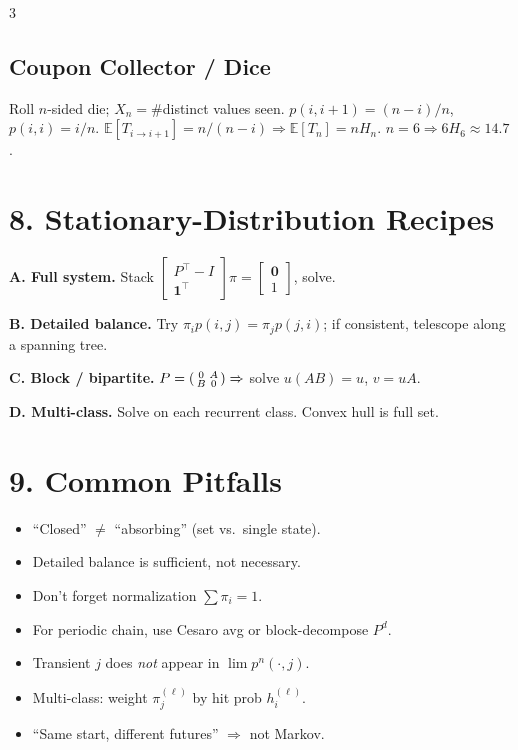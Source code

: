 \documentclass[8pt]{extarticle}
\newcommand{\E}{\mathbb{E}}
\renewcommand{\b}[1]{\mathbf{#1}}
\begin{document}
\begin{multicols*}{3}
		\subsection*{Coupon Collector / Dice}
		Roll $n$-sided die; $X_n=\#$distinct values seen. $p(i,i+1)=(n-i)/n$, $p(i,i)=i/n$. $\E[T_{i\to i+1}]=n/(n-i)\Rightarrow\E[T_n]=nH_n$. $n=6\Rightarrow 6H_6\approx 14.7$.
		
		\section*{8. Stationary-Distribution Recipes}
		
		\textbf{A. Full system.} Stack $\begin{bmatrix}P^\top-I\\ \b 1^\top\end{bmatrix}\!\pi=\begin{bmatrix}\b 0\\ 1\end{bmatrix}$, solve.
		
		\textbf{B. Detailed balance.} Try $\pi_i p(i,j)=\pi_j p(j,i)$; if consistent, telescope along a spanning tree.
		
		\textbf{C. Block / bipartite.} $P=\begin{psmallmatrix}0 & A\\ B & 0\end{psmallmatrix}\Rightarrow$ solve $u(AB)=u$, $v=uA$.
		
		\textbf{D. Multi-class.} Solve on each recurrent class. Convex hull is full set.
		
		\section*{9. Common Pitfalls}
		
		\begin{itemize}
			\item ``Closed'' $\ne$ ``absorbing'' (set vs.\ single state).
			\item Detailed balance is sufficient, not necessary.
			\item Don't forget normalization $\sum\pi_i=1$.
			\item For periodic chain, use Cesaro avg or block-decompose $P^d$.
			\item Transient $j$ does \emph{not} appear in $\lim p^n(\cdot,j)$.
			\item Multi-class: weight $\pi^{(\ell)}_j$ by hit prob $h^{(\ell)}_i$.
			\item ``Same start, different futures'' $\Rightarrow$ not Markov.
		\end{itemize}
		

\end{multicols*}
\end{document}
